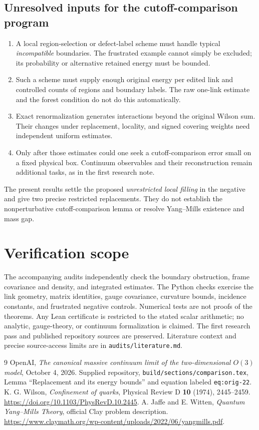 \documentclass[11pt]{article}
\theoremstyle{definition}
\theoremstyle{remark}
\begin{document}
\subsection*{Unresolved inputs for the cutoff-comparison program}
\begin{enumerate}
\item A local region-selection or defect-label scheme must handle typical
\emph{incompatible} boundaries. The frustrated example cannot simply be
excluded; its probability or alternative retained energy must be bounded.
\item Such a scheme must supply enough original energy per edited link
and controlled counts of regions and boundary labels. The raw one-link
estimate and the forest condition do not do this automatically.
\item Exact renormalization generates interactions beyond the original
Wilson sum. Their changes under replacement, locality, and signed
covering weights need independent uniform estimates.
\item Only after those estimates could one seek a cutoff-comparison
error small on a fixed physical box. Continuum observables and their
reconstruction remain additional tasks, as in the first research note.
\end{enumerate}
The present results settle the proposed \emph{unrestricted local filling}
in the negative and give two precise restricted replacements. They do
not establish the nonperturbative cutoff-comparison lemma or resolve
Yang--Mills existence and mass gap.

\section{Verification scope}
The accompanying audits independently check the boundary obstruction,
frame covariance and density, and integrated estimates. The Python
checks exercise the link geometry, matrix identities, gauge covariance,
curvature bounds, incidence constants, and frustrated negative controls.
Numerical tests are not proofs of the theorems. Any Lean certificate is
restricted to the stated scalar arithmetic; no analytic, gauge-theory,
or continuum formalization is claimed. The first research pass and
published repository sources are preserved. Literature context and
precise source-access limits are in \texttt{audits/literature.md}.

\begin{thebibliography}{9}
OpenAI, \emph{The canonical massive continuum limit of the two-dimensional
$O(3)$ model}, October 4, 2026. Supplied repository,
\texttt{build/sections/comparison.tex}, Lemma ``Replacement and its energy
bounds'' and equation labeled \texttt{eq:orig-22}.
K. G. Wilson, \emph{Confinement of quarks}, Physical Review D
\textbf{10} (1974), 2445--2459.
\url{https://doi.org/10.1103/PhysRevD.10.2445}.
A. Jaffe and E. Witten, \emph{Quantum Yang--Mills Theory}, official Clay
problem description.
\url{https://www.claymath.org/wp-content/uploads/2022/06/yangmills.pdf}.
\end{thebibliography}
\end{document}
